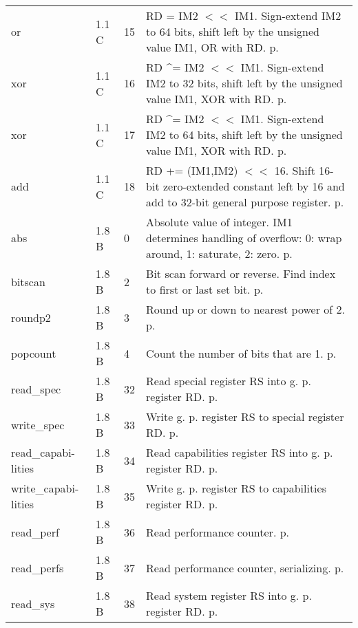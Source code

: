 \documentclass[forwardcom.tex]{subfiles}
\begin{document}
\begin{longtable} {|p{25mm}|p{14mm}|p{10mm}|p{95mm}|}
or            & 1.1 C & 15  & RD \textbar{}= IM2 $<<$ IM1. Sign-extend IM2 to 64 bits, shift left by the unsigned value IM1, OR with RD. p. \pageref{table:orInstruction} \\
xor           & 1.1 C & 16  & RD \^{}= IM2 $<<$ IM1. Sign-extend IM2 to 32 bits, shift left by the unsigned value IM1, XOR with RD. p. \pageref{table:xorInstruction} \\
xor           & 1.1 C & 17  & RD \^{}= IM2 $<<$ IM1. Sign-extend IM2 to 64 bits, shift left by the unsigned value IM1, XOR with RD. p. \pageref{table:xorInstruction} \\
add           & 1.1 C & 18  & RD += (IM1,IM2) $<<$ 16. Shift 16-bit zero-extended constant left by 16 and add to 32-bit general purpose register. p. \pageref{table:addInstruction} \\
abs           & 1.8 B &  0  & Absolute value of integer. IM1 determines handling of overflow: 0: wrap around, 1: saturate, 2: zero. p. \pageref{table:absInstruction} \\
bitscan       & 1.8 B &  2 & Bit scan forward or reverse. Find index to first or last set bit. p. \pageref{table:bitscanInstruction} \\
roundp2       & 1.8 B &  3 & Round up or down to nearest power of 2. p. \pageref{table:roundP2Instruction} \\
popcount      & 1.8 B &  4 & Count the number of bits that are 1. p. \pageref{table:popcountInstruction}\\
read\_spec    & 1.8 B & 32  & Read special register RS into g. p. register RD. p. \pageref{table:readSpecInstruction} \\
write\_spec   & 1.8 B & 33  & Write g. p. register RS to special register RD. p. \pageref{table:readSpecInstruction} \\
read\_capabi-lities & 1.8 B & 34  & Read capabilities register RS into g. p. register RD. p. \pageref{table:readCapabilitiesInstruction} \\
write\_capabi-lities & 1.8 B & 35  & Write g. p. register RS to capabilities register RD. p. \pageref{table:readCapabilitiesInstruction} \\
read\_perf    & 1.8 B & 36  & Read performance counter. p. \pageref{table:readPerfInstruction} \\
read\_perfs   & 1.8 B & 37  & Read performance counter, serializing. p. \pageref{table:readPerfSInstruction} \\
read\_sys     & 1.8 B & 38  & Read system register RS into g. p. register RD. p. \pageref{table:readSysInstruction} \\

\end{longtable}
\end{document}
